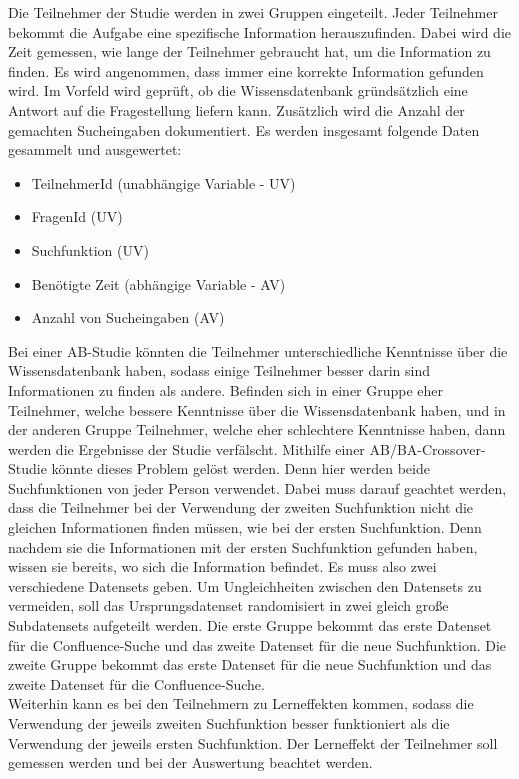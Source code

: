Die Teilnehmer der Studie werden in zwei Gruppen eingeteilt.
Jeder Teilnehmer bekommt die Aufgabe eine spezifische Information herauszufinden.
Dabei wird die Zeit gemessen, wie lange der Teilnehmer gebraucht hat, um die Information zu finden.
Es wird angenommen, dass immer eine korrekte Information gefunden wird.
Im Vorfeld wird geprüft, ob die Wissensdatenbank gründsätzlich eine Antwort auf die Fragestellung liefern kann. 
Zusätzlich wird die Anzahl der gemachten Sucheingaben dokumentiert.
Es werden insgesamt folgende Daten gesammelt und ausgewertet:
\begin{itemize}
    \item TeilnehmerId (unabhängige Variable - UV)
    \item FragenId (UV)
    \item Suchfunktion (UV)
    \item Benötigte Zeit (abhängige Variable - AV)
    \item Anzahl von Sucheingaben (AV)
\end{itemize}

Bei einer AB-Studie könnten die Teilnehmer unterschiedliche Kenntnisse über die Wissensdatenbank haben, sodass einige Teilnehmer besser darin sind Informationen zu finden als andere.
Befinden sich in einer Gruppe eher Teilnehmer, welche bessere Kenntnisse über die Wissensdatenbank haben, und in der anderen Gruppe Teilnehmer, welche eher schlechtere Kenntnisse haben, dann werden die Ergebnisse der Studie verfälscht.
Mithilfe einer AB/BA-Crossover-Studie könnte dieses Problem gelöst werden.
Denn hier werden beide Suchfunktionen von jeder Person verwendet.
Dabei muss darauf geachtet werden, dass die Teilnehmer bei der Verwendung der zweiten Suchfunktion nicht die gleichen Informationen finden müssen, wie bei der ersten Suchfunktion.
Denn nachdem sie die Informationen mit der ersten Suchfunktion gefunden haben, wissen sie bereits, wo sich die Information befindet.
Es muss also zwei verschiedene Datensets geben.
Um Ungleichheiten zwischen den Datensets zu vermeiden, soll das Ursprungsdatenset randomisiert in zwei gleich große Subdatensets aufgeteilt werden.
Die erste Gruppe bekommt das erste Datenset für die Confluence-Suche und das zweite Datenset für die neue Suchfunktion.
Die zweite Gruppe bekommt das erste Datenset für die neue Suchfunktion und das zweite Datenset für die Confluence-Suche.\\

Weiterhin kann es bei den Teilnehmern zu Lerneffekten kommen, sodass die Verwendung der jeweils zweiten Suchfunktion besser funktioniert als die Verwendung der jeweils ersten Suchfunktion.
Der Lerneffekt der Teilnehmer soll gemessen werden und bei der Auswertung beachtet werden.

